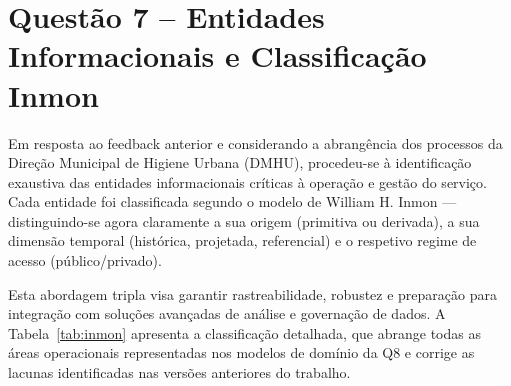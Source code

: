 \documentclass[12pt,a4paper,final]{article}
\begin{document}
    \section*{Questão 7 – Entidades Informacionais e Classificação Inmon}

    Em resposta ao feedback anterior e considerando a abrangência dos processos da Direção Municipal de Higiene Urbana (DMHU), procedeu-se à identificação exaustiva das entidades informacionais críticas à operação e gestão do serviço. Cada entidade foi classificada segundo o modelo de William H. Inmon — distinguindo-se agora claramente a sua origem (primitiva ou derivada), a sua dimensão temporal (histórica, projetada, referencial) e o respetivo regime de acesso (público/privado).

    Esta abordagem tripla visa garantir rastreabilidade, robustez e preparação para integração com soluções avançadas de análise e governação de dados. A Tabela~\ref{tab:inmon} apresenta a classificação detalhada, que abrange todas as áreas operacionais representadas nos modelos de domínio da Q8 e corrige as lacunas identificadas nas versões anteriores do trabalho.
\end{document}
